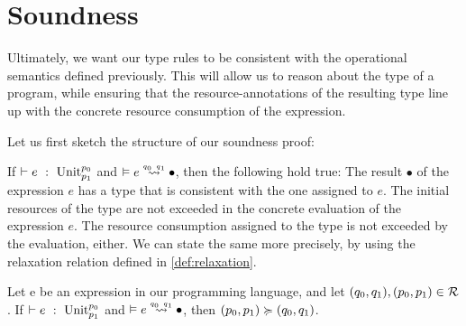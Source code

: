 \section{Soundness}
Ultimately, we want our type rules to be consistent with the operational semantics defined previously. This will allow us to reason about the type of a program, while ensuring that the resource-annotations of the resulting type line up with the concrete resource consumption of the expression.

Let us first sketch the structure of our soundness proof:

If \(\vdash e~:~\text{Unit} ^{p_0}_{p_1}\) and \(\evals{}{e}{\bullet}{q_0}{q_1}\), then the following hold true:
The result \(\bullet\) of the expression \(e\) has a type that is consistent with the one assigned to \(e\). The initial resources of the type are not exceeded in the concrete evaluation of the expression \(e\). The resource consumption assigned to the type is not exceeded by the evaluation, either. We can state the same more precisely, by using the relaxation relation defined in \cref{def:relaxation}.

\begin{theorem}\label{thm:soundness-let-tick}
   Let e be an expression in our programming language, and let \((q_0, q_1), (p_0, p_1) \in \mathcal{R}\). 
   \center If \(\vdash e~:~\text{Unit} ^{p_0}_{p_1}\) and \(\evals{}{e}{\bullet}{q_0}{q_1}\), then \((p_0, p_1) \succcurlyeq (q_0, q_1)\).
\end{theorem}

